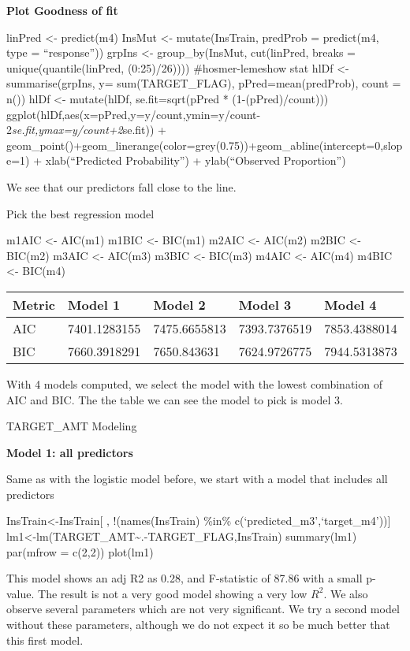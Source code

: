 \documentclass[]{article}
\begin{document}
\textbf{Plot Goodness of fit}

linPred \textless- predict(m4) InsMut \textless- mutate(InsTrain,
predProb = predict(m4, type = ``response'')) grpIns \textless-
group\_by(InsMut, cut(linPred, breaks = unique(quantile(linPred,
(0:25)/26)))) \#hosmer-lemeshow stat hlDf \textless- summarise(grpIns,
y= sum(TARGET\_FLAG), pPred=mean(predProb), count = n()) hlDf \textless-
mutate(hlDf, se.fit=sqrt(pPred * (1-(pPred)/count)))
ggplot(hlDf,aes(x=pPred,y=y/count,ymin=y/count-2\emph{se.fit,ymax=y/count+2}se.fit))
+
geom\_point()+geom\_linerange(color=grey(0.75))+geom\_abline(intercept=0,slope=1)
+ xlab(``Predicted Probability'') + ylab(``Observed Proportion'')

We see that our predictors fall close to the line.

Pick the best regression model

m1AIC \textless- AIC(m1) m1BIC \textless- BIC(m1) m2AIC \textless-
AIC(m2) m2BIC \textless- BIC(m2) m3AIC \textless- AIC(m3) m3BIC
\textless- BIC(m3) m4AIC \textless- AIC(m4) m4BIC \textless- BIC(m4)

\begin{longtable}[]{@{}lllll@{}}
\toprule
Metric & Model 1 & Model 2 & Model 3 & Model 4\tabularnewline
\midrule
\endhead
AIC & 7401.1283155 & 7475.6655813 & 7393.7376519 &
7853.4388014\tabularnewline
BIC & 7660.3918291 & 7650.843631 & 7624.9726775 &
7944.5313873\tabularnewline
\bottomrule
\end{longtable}

With 4 models computed, we select the model with the lowest combination
of AIC and BIC. The the table we can see the model to pick is model 3.

TARGET\_AMT Modeling

\textbf{Model 1: all predictors}

Same as with the logistic model before, we start with a model that
includes all predictors

InsTrain\textless-InsTrain{[} , !(names(InsTrain) \%in\%
c(`predicted\_m3',`target\_m4')){]}
lm1\textless-lm(TARGET\_AMT\textasciitilde.-TARGET\_FLAG,InsTrain)
summary(lm1) par(mfrow = c(2,2)) plot(lm1)

This model shows an adj R2 as 0.28, and F-statistic of 87.86 with a
small p-value. The result is not a very good model showing a very low
\(R^2\). We also observe several parameters which are not very
significant. We try a second model without these parameters, although we
do not expect it so be much better that this first model.
\end{document}
